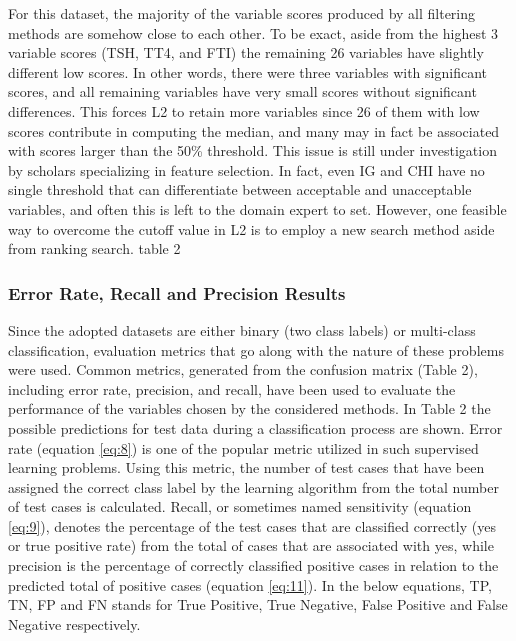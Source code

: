 \documentclass[review]{elsarticle}
\begin{document}
For this dataset, the majority of the variable scores produced by all filtering methods are somehow close to each other. To be exact, aside from the highest 3 variable scores (TSH, TT4, and FTI) the remaining 26 variables have slightly different low scores. In other words, there were three variables with significant scores, and all remaining variables have very small scores without significant differences. This forces L2 to retain more variables since 26 of them with low scores contribute in computing the median, and many may in fact be associated with scores larger than the 50\% threshold.  This issue is still under investigation by scholars specializing in feature selection. In fact, even IG and CHI have no single threshold that can differentiate between acceptable and unacceptable variables, and often this is left to the domain expert to set. However, one feasible way to overcome the cutoff value in L2 is to employ a new search method aside from ranking search.\newline
table 2

\subsubsection{Error Rate, Recall and Precision Results }

Since the adopted datasets are either binary (two class labels) or multi-class classification, evaluation metrics that go along with the nature of these problems were used. Common metrics, generated from the confusion matrix (Table 2), including error rate, precision, and recall, have been used to evaluate the performance of the variables chosen by the considered methods. In Table 2 the possible predictions for test data during a classification process are shown. Error rate (equation \ref{eq:8}) is one of the popular metric utilized in such supervised learning problems. Using this metric, the number of test cases that have been assigned the correct class label by the learning algorithm from the total number of test cases is calculated. Recall, or sometimes named sensitivity  (equation \ref{eq:9}), denotes the percentage of the test cases that are classified correctly (yes or true positive rate) from the total of cases that are associated with yes, while precision is the percentage of correctly classified positive cases in relation to the predicted total of positive cases (equation \ref{eq:11}). In the below equations, TP, TN, FP and FN stands for True Positive, True Negative, False Positive and False Negative respectively. 
\end{document}
